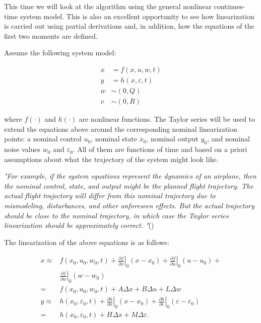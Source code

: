 This time we will look at the algorithm using the general nonlinear continues-time system model. This is also an excellent opportunity to see how linearization is carried out using partial derivations and, in addition, how the equations of the first two moments are defined.

Assume the following system model:

\begin{align*}
x &=f(x, u, w, t) \\
y &=h(x, \varepsilon, t) \\
w & \sim(0, Q) \\
v & \sim(0, R)
\end{align*}

\noindent where \(f(\cdot)\) and \(h(\cdot)\) are nonlinear functions. The Taylor series will be used to extend the equations above around the corresponding nominal linearization points: a nominal control \(u_0\), nominal state \(x_0\), nominal output \(y_0\), and nominal noise values \(w_0\) and \(\varepsilon_0\). All of them are functions of time and based on a priori assumptions about what the trajectory of the system might look like.

{\em
"For example, if the system equations
represent the dynamics of an airplane, then the nominal control, state, and output
might be the planned flight trajectory. The actual flight trajectory will differ from
this nominal trajectory due to mismodeling, disturbances, and other unforeseen effects.
But the actual trajectory should be close to the nominal trajectory, in which
case the Taylor series linearization should be approximately correct.
"}(\cite[page~397]{simon_optimal_2006})

The linearization of the above equations is as follows:

\begin{equation}
\begin{aligned}
x \approx & f\left(x_0, u_0, w_0, t\right)+\left.\frac{\partial f}{\partial x}\right|_0\left(x-x_0\right)+\left.\frac{\partial f}{\partial u}\right|_0\left(u-u_0\right)+\\
&\left.\frac{\partial f}{\partial w}\right|_0\left(w-w_0\right) \\
=& f\left(x_0, u_0, w_0, t\right)+A \Delta x+B \Delta u+L \Delta w \\
y \approx & h\left(x_0, \varepsilon_0, t\right)+\left.\frac{\partial h}{\partial x}\right|_0\left(x-x_0\right)+\left.\frac{\partial h}{\partial \varepsilon}\right|_0\left(\varepsilon-\varepsilon_0\right) \\
=& h\left(x_0, \varepsilon_0, t\right)+H \Delta x+M \Delta \varepsilon.
\label{eq:continues_time_model_derivation}
\end{aligned}
\end{equation}

